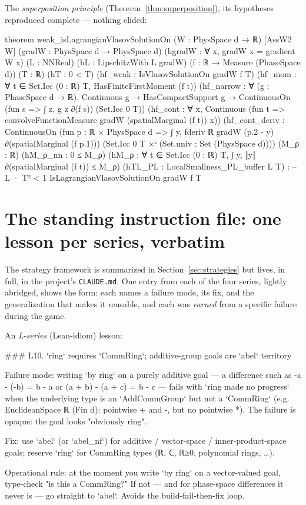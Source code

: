 \documentclass[11pt]{article}
\theoremstyle{plain}
\theoremstyle{definition}
\theoremstyle{remark}
\newcommand{\lean}[1]{\texttt{#1}}
\begin{document}
\noindent The \emph{superposition principle} (Theorem~\ref{thm:superposition}), its
hypotheses reproduced complete --- nothing elided:
\begin{leancode}
theorem weak_isLagrangianVlasovSolutionOn
    (W : PhysSpace d → ℝ) [AssW2 W]
    (gradW : PhysSpace d → PhysSpace d) (hgradW : ∀ x, gradW x = gradient W x)
    (L : NNReal) (hL : LipschitzWith L gradW)
    (f : ℝ → Measure (PhaseSpace d)) (T : ℝ) (hT : 0 < T)
    (hf_weak : IsVlasovSolutionOn gradW f T)
    (hf_mom : ∀ t ∈ Set.Icc (0 : ℝ) T, HasFiniteFirstMoment (f t))
    (hf_narrow : ∀ (g : PhaseSpace d → ℝ), Continuous g → HasCompactSupport g →
      ContinuousOn (fun s => ∫ z, g z ∂(f s)) (Set.Icc 0 T))
    (hf_cont : ∀ x, Continuous
      (fun t => convolveFunctionMeasure gradW (spatialMarginal (f t)) x))
    (hf_cont_deriv : ContinuousOn
      (fun p : ℝ × PhysSpace d =>
        ∫ y, fderiv ℝ gradW (p.2 - y) ∂(spatialMarginal (f p.1)))
      (Set.Icc 0 T ×ˢ (Set.univ : Set (PhysSpace d))))
    (M_ρ : ℝ) (hM_ρ_nn : 0 ≤ M_ρ)
    (hM_ρ : ∀ t ∈ Set.Icc (0 : ℝ) T, ∫ y, ‖y‖ ∂(spatialMarginal (f t)) ≤ M_ρ)
    (hTL_PL : LocalSmallness_PL_buffer L T) :  -- L · T² < 1
    IsLagrangianVlasovSolutionOn gradW f T
\end{leancode}

\section{The standing instruction file: one lesson per series, verbatim}\label{app:claudemd}

The strategy framework is summarized in Section~\ref{sec:strategies} but
lives, in full, in the project's \lean{CLAUDE.md}. One entry from each of the four
series, lightly abridged, shows the form: each names a failure mode, its fix, and
the generalization that makes it reusable, and each was \emph{earned} from a
specific failure during the game.

\noindent An \emph{L-series} (Lean-idiom) lesson:
\begin{leancode}
### L10. `ring` requires `CommRing`; additive-group goals are `abel` territory

Failure mode: writing `by ring` on a purely additive goal — a difference such as
  -a - (-b) = b - a   or   (a + b) - (a + c) = b - c
— fails with `ring made no progress` when the underlying type is an `AddCommGroup`
but not a `CommRing` (e.g. EuclideanSpace ℝ (Fin d): pointwise + and -, but no
pointwise *).  The failure is opaque: the goal looks "obviously ring".

Fix: use `abel` (or `abel_nf`) for additive / vector-space / inner-product-space
goals; reserve `ring` for CommRing types (ℝ, ℂ, ℝ≥0, polynomial rings, …).

Operational rule: at the moment you write `by ring` on a vector-valued goal,
type-check "is this a CommRing?"  If not — and for phase-space differences it never
is — go straight to `abel`.  Avoids the build-fail-then-fix loop.
\end{leancode}
\end{document}
